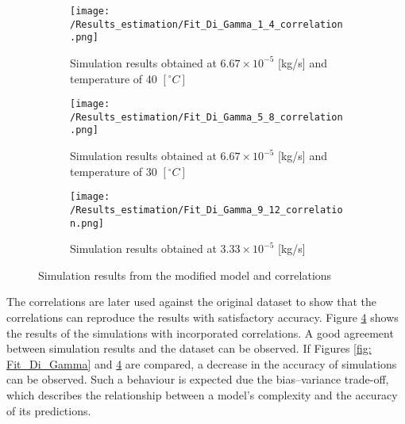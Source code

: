 \documentclass[../Supercritical_fluid_extraction_of_essential_oil_from_chamomile.tex]{subfiles}
\begin{document}
	\begin{figure}[!h]
		\centering
		\begin{subfigure}{0.66\columnwidth}
			\centering
			\texttt{[image: /Results\_estimation/Fit\_Di\_Gamma\_1\_4\_correlation.png]}
			\caption{Simulation results obtained at $6.67\times 10^{-5}$ [kg/s] and temperature of 40 $[^\circ C]$}
			\label{fig: Fit_1_4_Di_Gamma_correlation}
		\end{subfigure}
		\hfill
		\begin{subfigure}{0.66\columnwidth}
			\centering
			\texttt{[image: /Results\_estimation/Fit\_Di\_Gamma\_5\_8\_correlation.png]}
			\caption{Simulation results obtained at $6.67\times 10^{-5}$ [kg/s] and temperature of 30 $[^\circ C]$}
			\label{fig: Fit_5_8_Di_Gamma_correlation}
		\end{subfigure}
		\hfill
		\begin{subfigure}{0.66\columnwidth}
			\centering
			\texttt{[image: /Results\_estimation/Fit\_Di\_Gamma\_9\_12\_correlation.png]}
			\caption{Simulation results obtained at $3.33\times 10^{-5}$ [kg/s]}
			\label{fig: Fit_9_12_Di_Gamma_correlation}
		\end{subfigure}
		\caption{Simulation results from the modified model and correlations}
		\label{fig: Fit_Di_Gamma_correlation}
	\end{figure}
	
	The correlations are later used against the original dataset to show that the correlations can reproduce the results with satisfactory accuracy. Figure \ref{fig: Fit_Di_Gamma_correlation} shows the results of the simulations with incorporated correlations. A good agreement between simulation results and the dataset can be observed. If Figures \ref{fig: Fit_Di_Gamma} and \ref{fig: Fit_Di_Gamma_correlation} are compared, a decrease in the accuracy of simulations can be observed. Such a behaviour is expected due the bias–variance trade-off, which describes the relationship between a model's complexity and the accuracy of its predictions.
	
	
\end{document}
